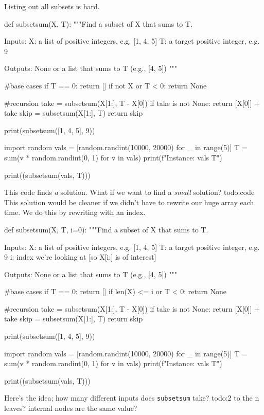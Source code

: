 Listing out all subsets is hard.
\begin{python}
    def subsetsum(X, T):
    """Find a subset of X that sums to T.

    Inputs:
        X: a list of positive integers, e.g. [1, 4, 5]
        T: a target positive integer, e.g. 9

    Outputs:
        None or a list that sums to T (e.g., [4, 5])
    """

    #base cases
    if T == 0:
        return []
    if not X or T < 0:
        return None

    #recursion
    take = subsetsum(X[1:], T - X[0])
    if take is not None:
        return [X[0]] + take
    skip = subsetsum(X[1:], T)
    return skip

print(subsetsum([1, 4, 5], 9))

import random
vals = [random.randint(10000, 20000) for _ in range(5)]
T = sum(v * random.randint(0, 1) for v in vals)
print(f"Instance: {vals} {T}")

print((subsetsum(vals, T)))
\end{python}
This code finds \emph{a} solution. What if we want to find a \emph{small} solution?
{\color{red}todo:code} 
This solution would be cleaner if we didn't have to rewrite our huge array each time. We do this by rewriting with an index. 
\begin{python}
    def subsetsum(X, T, i=0):
    """Find a subset of X that sums to T.

    Inputs:
        X: a list of positive integers, e.g. [1, 4, 5]
        T: a target positive integer, e.g. 9
        i: index we're looking at [so X[i:] is of interest]

    Outputs:
        None or a list that sums to T (e.g., [4, 5])
    """

    #base cases
    if T == 0:
        return []
    if len(X) <= i or T < 0:
        return None

    #recursion
    take = subsetsum(X[1:], T - X[0])
    if take is not None:
        return [X[0]] + take
    skip = subsetsum(X[1:], T)
    return skip

print(subsetsum([1, 4, 5], 9))

import random
vals = [random.randint(10000, 20000) for _ in range(5)]
T = sum(v * random.randint(0, 1) for v in vals)
print(f"Instance: {vals} {T}")

print((subsetsum(vals, T)))
\end{python}
Here's the idea; how many different inputs does \texttt{subsetsum} take? {\color{red}todo:2 to the n leaves? internal nodes are the same value?} 


